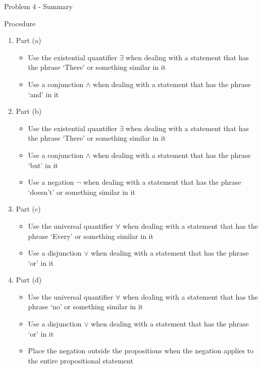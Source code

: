 \begin{summary}{Problem 4 - Summary}
    \begin{statement}{Procedure}
        \begin{enumerate}[label = (\alph*)]
            \item Part (a)
            \begin{itemize}
                \item Use the existential quantifier $\exists$ when dealing with a statement that has the phrase `There' or something similar in it
                \item Use a conjunction $\wedge$ when dealing with a statement that has the phrase `and' in it
            \end{itemize}
            \item Part (b)
            \begin{itemize}
                \item Use the existential quantifier $\exists$ when dealing with a statement that has the phrase `There' or something similar in it
                \item Use a conjunction $\wedge$ when dealing with a statement that has the phrase `but' in it
                \item Use a negation $\neg$ when dealing with a statement that has the phrase `doesn't' or something similar in it
            \end{itemize}
            \item Part (c)
            \begin{itemize}
                \item Use the universal quantifier $\forall$ when dealing with a statement that has the phrase `Every' or something similar in it
                \item Use a disjunction $\vee$ when dealing with a statement that has the phrase `or' in it
            \end{itemize}
            \item Part (d)
            \begin{itemize}
                \item Use the universal quantifier $\forall$ when dealing with a statement that has the phrase `no' or something similar in it
                \item Use a disjunction $\vee$ when dealing with a statement that has the phrase `or' in it
                \item Place the negation outside the propositions when the negation applies to the entire propositional statement

\end{itemize}
\end{enumerate}
\end{statement}
\end{summary}

